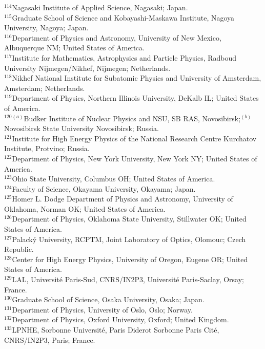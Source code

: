 \begin{flushleft}
$^{114}$Nagasaki Institute of Applied Science, Nagasaki; Japan.\\
$^{115}$Graduate School of Science and Kobayashi-Maskawa Institute, Nagoya University, Nagoya; Japan.\\
$^{116}$Department of Physics and Astronomy, University of New Mexico, Albuquerque NM; United States of America.\\
$^{117}$Institute for Mathematics, Astrophysics and Particle Physics, Radboud University Nijmegen/Nikhef, Nijmegen; Netherlands.\\
$^{118}$Nikhef National Institute for Subatomic Physics and University of Amsterdam, Amsterdam; Netherlands.\\
$^{119}$Department of Physics, Northern Illinois University, DeKalb IL; United States of America.\\
$^{120}$$^{(a)}$Budker Institute of Nuclear Physics and NSU, SB RAS, Novosibirsk;$^{(b)}$Novosibirsk State University Novosibirsk; Russia.\\
$^{121}$Institute for High Energy Physics of the National Research Centre Kurchatov Institute, Protvino; Russia.\\
$^{122}$Department of Physics, New York University, New York NY; United States of America.\\
$^{123}$Ohio State University, Columbus OH; United States of America.\\
$^{124}$Faculty of Science, Okayama University, Okayama; Japan.\\
$^{125}$Homer L. Dodge Department of Physics and Astronomy, University of Oklahoma, Norman OK; United States of America.\\
$^{126}$Department of Physics, Oklahoma State University, Stillwater OK; United States of America.\\
$^{127}$Palack\'y University, RCPTM, Joint Laboratory of Optics, Olomouc; Czech Republic.\\
$^{128}$Center for High Energy Physics, University of Oregon, Eugene OR; United States of America.\\
$^{129}$LAL, Universit\'e Paris-Sud, CNRS/IN2P3, Universit\'e Paris-Saclay, Orsay; France.\\
$^{130}$Graduate School of Science, Osaka University, Osaka; Japan.\\
$^{131}$Department of Physics, University of Oslo, Oslo; Norway.\\
$^{132}$Department of Physics, Oxford University, Oxford; United Kingdom.\\
$^{133}$LPNHE, Sorbonne Universit\'e, Paris Diderot Sorbonne Paris Cit\'e, CNRS/IN2P3, Paris; France.\\
$$
\end{flushleft}
